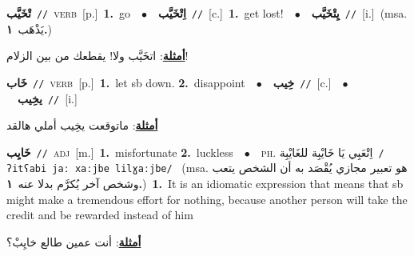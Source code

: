 \documentclass[10pt,a4paper,twoside]{article} %
\begin{document}
\begin{multicols}{2}
{\setlength\topsep{0pt}\textbf{\foreignlanguage{arabic}{تْخَيَّب}}\ {\color{gray}\texttt{//}\color{black}}\ \textsc{verb}\ [p.]\ \textbf{1.}~go\ \ $\bullet$\ \ \setlength\topsep{0pt}\textbf{\foreignlanguage{arabic}{اِتْخَيَّب}}\ {\color{gray}\texttt{//}\color{black}}\ [c.]\ \textbf{1.}~get lost!\ \ $\bullet$\ \ \setlength\topsep{0pt}\textbf{\foreignlanguage{arabic}{يِتْخَيَّب}}\ {\color{gray}\texttt{//}\color{black}}\ [i.]\ \color{gray}(msa. \foreignlanguage{arabic}{يَذْهَب}~\foreignlanguage{arabic}{\textbf{١.}})\color{black}\  \begin{flushright}\color{gray}\foreignlanguage{arabic}{\textbf{\underline{\foreignlanguage{arabic}{أمثلة}}}: اتخَيَّب ولا! يقطعك من بين الزلام!}\end{flushright}\color{black}} \vspace{2mm}

{\setlength\topsep{0pt}\textbf{\foreignlanguage{arabic}{خَاب}}\ {\color{gray}\texttt{//}\color{black}}\ \textsc{verb}\ [p.]\ \textbf{1.}~let sb down.  \textbf{2.}~disappoint\ \ $\bullet$\ \ \setlength\topsep{0pt}\textbf{\foreignlanguage{arabic}{خِيب}}\ {\color{gray}\texttt{//}\color{black}}\ [c.]\ \ $\bullet$\ \ \setlength\topsep{0pt}\textbf{\foreignlanguage{arabic}{يخِيب}}\ {\color{gray}\texttt{//}\color{black}}\ [i.]\  \begin{flushright}\color{gray}\foreignlanguage{arabic}{\textbf{\underline{\foreignlanguage{arabic}{أمثلة}}}: ماتوقعت يخِيب أملي هالقد}\end{flushright}\color{black}} \vspace{2mm}

{\setlength\topsep{0pt}\textbf{\foreignlanguage{arabic}{خَايِب}}\ {\color{gray}\texttt{//}\color{black}}\ \textsc{adj}\ [m.]\ \textbf{1.}~misfortunate  \textbf{2.}~luckless\ \ $\bullet$\ \ \textsc{ph.} \color{gray} \foreignlanguage{arabic}{اِتْعَبِي يَا خَايْبِة للغَايْبِة}\color{black}\ {\color{gray}\texttt{/{\sffamily ʔitʕabi jaː xaːjbe lilɣaːjbe}/}\color{black}}\ \color{gray} (msa. \foreignlanguage{arabic}{هو تعبير مجازي يُقْصَد به أن الشخص يتعب وشخص آخر يُكرَّم بدلا عنه}~\foreignlanguage{arabic}{\textbf{١.}})\color{black}\ \textbf{1.}~It is an idiomatic expression that means that sb might make a tremendous effort for nothing, because another person will take the credit and be rewarded instead of him\  \begin{flushright}\color{gray}\foreignlanguage{arabic}{\textbf{\underline{\foreignlanguage{arabic}{أمثلة}}}: أنت عمين طالع خايِبْ؟}\end{flushright}\color{black}} \vspace{2mm}


\end{multicols}
\end{document}
